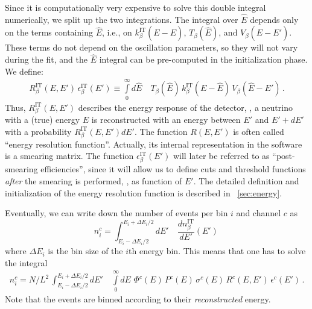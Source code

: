 Since it is computationally very expensive to solve this double integral
numerically, we split up the two integrations. The integral over $\hat{E}$
depends only on the terms containing $\hat{E}$, i.e., on $k_\beta^{\text{IT}}(E-\hat{E})$,
$ T_\beta(\hat{E})$, and $V_\beta(\hat{E}-E')$. These terms do not depend
on the oscillation parameters, so they will not vary during the fit,
and the $\hat{E}$ integral can be pre-computed in the initialization phase.
We define:
\begin{eqnarray}
\label{eq:e_res} 
R_\beta^{\text{IT}}(E,E')\,\epsilon_\beta^{\text{IT}}(E')
 \equiv
\int\limits_0^\infty d\hat{E} \quad T_\beta(\hat{E})\,k_\beta^{\text{IT}}(E-\hat{E})
\,V_\beta(\hat{E}-E')\,. 
\end{eqnarray}
Thus, $R_\beta^{\text{IT}}(E,E')$ describes the energy response of 
the detector, \ie , a neutrino with a (true) energy $E$ is reconstructed
with an energy between $E'$ and $E'+dE'$ with a probability
$R_\beta^{\text{IT}}(E,E') dE'$. The function $R(E,E')$ is often called ``energy resolution function''. Actually, its internal representation
in the software is a smearing matrix. The function $\epsilon_\beta^{\text{IT}}(E')$ will later be referred to as ``post-smearing efficiencies'', since it will allow us to define cuts and threshold functions {\em after} the smearing is performed, \ie, as function of $E'$. The detailed definition and initialization of the energy resolution function is described in \Sec~\ref{sec:energy}.

Eventually, we can write down the number of events per bin $i$  and channel $c$ as
\begin{equation}
\label{eq:channel}
n_i^c=\int_{E_i-\Delta E_i/2}^{E_i+\Delta E_i/2} dE' \quad
\frac{dn_{\beta}^{\text{IT}}}{dE'} (E') \,
\end{equation}
where $\Delta E_i$ is the bin size of the $i$th energy bin.
This means that one has to solve the integral
\begin{eqnarray}
\label{eq:events_bin}
n_i^c=N/L^2\,\int_{E_i-\Delta E_i/2}^{E_i+\Delta E_i/2} dE' 
\quad \int\limits_0^\infty dE \,\, \Phi^c(E)\,
P^c(E)\,
\sigma^c(E)\,
R^c(E,E')\,
\epsilon^c(E')\,.
\end{eqnarray} 
Note that the events are binned according to their \emph{reconstructed} energy.

